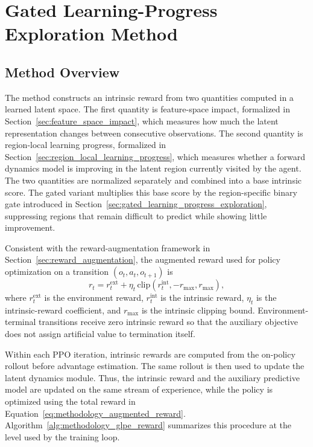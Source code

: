 \section{Gated Learning-Progress Exploration Method}
\label{sec:methodology_method}

\subsection{Method Overview}
\label{subsec:method_overview}

The method constructs an intrinsic reward from two quantities computed in a learned latent space.
The first quantity is feature-space impact, formalized in Section~\ref{sec:feature_space_impact}, which measures how much the latent representation changes between consecutive observations.
The second quantity is region-local learning progress, formalized in Section~\ref{sec:region_local_learning_progress}, which measures whether a forward dynamics model is improving in the latent region currently visited by the agent.
The two quantities are normalized separately and combined into a base intrinsic score.
The gated variant multiplies this base score by the region-specific binary gate introduced in Section~\ref{sec:gated_learning_progress_exploration}, suppressing regions that remain difficult to predict while showing little improvement.

Consistent with the reward-augmentation framework in Section~\ref{sec:reward_augmentation}, the augmented reward used for policy optimization on a transition $(o_t,a_t,o_{t+1})$ is
\begin{equation}
    r_t
    = r_t^{\mathrm{ext}}
    + \eta_t\,\mathrm{clip}\!\left(r_t^{\mathrm{int}},-r_{\max},r_{\max}\right),
    \label{eq:methodology_augmented_reward}
\end{equation}
where $r_t^{\mathrm{ext}}$ is the environment reward, $r_t^{\mathrm{int}}$ is the intrinsic reward, $\eta_t$ is the intrinsic-reward coefficient, and $r_{\max}$ is the intrinsic clipping bound.
Environment-terminal transitions receive zero intrinsic reward so that the auxiliary objective does not assign artificial value to termination itself.

Within each PPO iteration, intrinsic rewards are computed from the on-policy rollout before advantage estimation.
The same rollout is then used to update the latent dynamics module.
Thus, the intrinsic reward and the auxiliary predictive model are updated on the same stream of experience, while the policy is optimized using the total reward in Equation~\ref{eq:methodology_augmented_reward}.
Algorithm~\ref{alg:methodology_glpe_reward} summarizes this procedure at the level used by the training loop.

